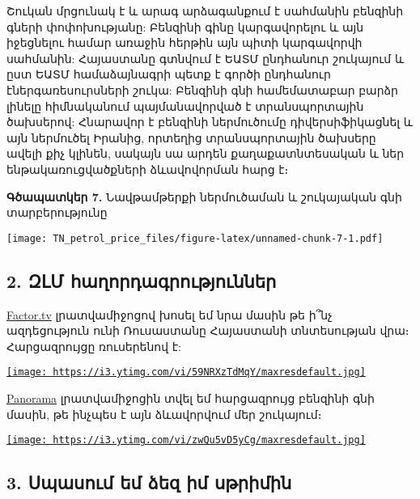 \documentclass[
]{article}
\begin{document}
Շուկան մրցունակ է և արագ արձագանքում է սահմանին բենզինի գների
փոփոխությանը: Բենզինի գինը կարգավորելու և այն իջեցնելու համար առաջին
հերթին այն պիտի կարգավորվի սահմանին: Հայաստանը գտնվում է ԵԱՏՄ ընդհանուր
շուկայում և ըստ ԵԱՏՄ համաձայնագրի պետք է գործի ընդհանուր
էներգառեսուրսների շուկա: Բենզինի գնի համեմատաբար բարձր լինելը
հիմնականում պայմանավորված է տրանսպորտային ծախսերով: Հնարավոր է բենզինի
ներմուծումը դիվերսիֆիկացնել և այն ներմուծել Իրանից, որտեղից
տրանսպորտային ծախսերը ավելի քիչ կլինեն, սակայն սա արդեն քաղաքատնտեսական
և ներ ենթակառուցվածքների ձևավովորման հարց է։

\textbf{Գծապատկեր 7.} Նավթամթերքի ներմուծաման և շուկայական գնի
տարբերությունը

\texttt{[image: TN\_petrol\_price\_files/figure-latex/unnamed-chunk-7-1.pdf]}

\hypertarget{ux566ux56cux574-ux570ux561ux572ux578ux580ux564ux561ux563ux580ux578ux582ux569ux575ux578ux582ux576ux576ux565ux580}{%
\subsection{2. ԶԼՄ
հաղորդագրություններ}\label{ux566ux56cux574-ux570ux561ux572ux578ux580ux564ux561ux563ux580ux578ux582ux569ux575ux578ux582ux576ux576ux565ux580}}

\href{https://www.youtube.com/watch?v=59NRXzTdMqY}{Factor.tv}
լրատվամիջոցով խոսել եմ նրա մասին թե ի՞նչ ազդեցություն ունի Ռուսաստանը
Հայաստանի տնտեսության վրա։ Հարցազրույցը ռուսերենով է:

\href{https://www.youtube.com/watch?v=59NRXzTdMqY}{\texttt{[image: https://i3.ytimg.com/vi/59NRXzTdMqY/maxresdefault.jpg]}}

\href{https://www.panorama.am/am/news/2023/11/17/\%D4\%B1\%D5\%B2\%D5\%A1\%D5\%BD\%D5\%AB-\%D4\%B9\%D5\%A1\%D5\%BE\%D5\%A1\%D5\%A4\%D5\%B5\%D5\%A1\%D5\%B6/2927178}{Panorama}
լրատվամիջոցին տվել եմ հարցազրույց բենզինի գնի մասին, թե ինչպես է այն
ձևավորվում մեր շուկայում։

\href{https://www.youtube.com/watch?v=zwQu5vD5yCg}{\texttt{[image: https://i3.ytimg.com/vi/zwQu5vD5yCg/maxresdefault.jpg]}}

\hypertarget{ux57dux57aux561ux57dux578ux582ux574-ux565ux574-ux571ux565ux566-ux56bux574-ux57dux569ux580ux56bux574ux56bux576}{%
\subsection{3. Սպասում եմ ձեզ իմ
սթրիմին}\label{ux57dux57aux561ux57dux578ux582ux574-ux565ux574-ux571ux565ux566-ux56bux574-ux57dux569ux580ux56bux574ux56bux576}}
\end{document}
